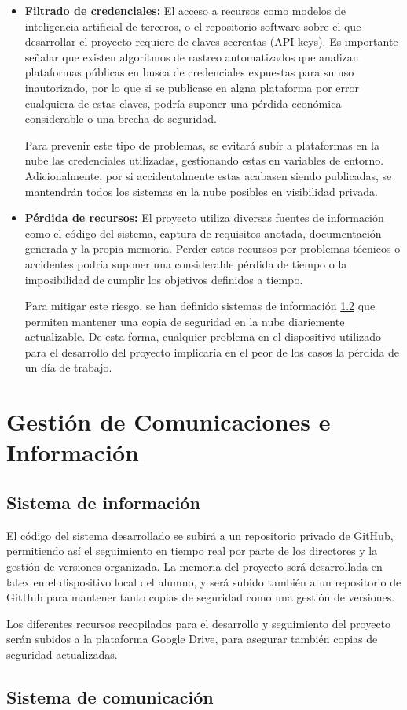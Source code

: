 \begin{itemize}
  \item\textbf{Filtrado de credenciales: }El acceso a recursos como modelos de inteligencia artificial de terceros, o el repositorio software sobre el que desarrollar el proyecto requiere de claves secreatas (API-keys). Es importante señalar que existen algoritmos de rastreo automatizados que analizan plataformas públicas en busca de credenciales expuestas para su uso inautorizado, por lo que si se publicase en algna plataforma por error cualquiera de estas claves, podría suponer una pérdida económica considerable o una brecha de seguridad.

Para prevenir este tipo de problemas, se evitará subir a plataformas en la nube las credenciales utilizadas, gestionando estas en variables de entorno. Adicionalmente, por si accidentalmente estas acabasen siendo publicadas, se mantendrán todos los sistemas en la nube posibles en visibilidad privada.


  \item\textbf{Pérdida de recursos: }El proyecto utiliza diversas fuentes de información como el código del sistema, captura de requisitos anotada, documentación generada y la propia memoria. Perder estos recursos por problemas técnicos o accidentes podría suponer una considerable pérdida de tiempo o la imposibilidad de cumplir los objetivos definidos a tiempo.

Para mitigar este riesgo, se han definido sistemas de información \ref{} que permiten mantener una copia de seguridad en la nube diariemente actualizable. De esta forma, cualquier problema en el dispositivo utilizado para el desarrollo del proyecto implicaría en el peor de los casos la pérdida de un día de trabajo. 
\end{itemize}

\section{Gestión de Comunicaciones e Información}

\subsection{Sistema de información}

El código del sistema desarrollado se subirá a un repositorio privado de GitHub, permitiendo así el seguimiento en tiempo real por parte de los directores y la gestión de versiones organizada. La memoria del proyecto será desarrollada en latex en el dispositivo local del alumno, y será subido también a un repositorio de GitHub para mantener tanto copias de seguridad como una gestión de versiones. 

Los diferentes recursos recopilados para el desarrollo y seguimiento del proyecto serán subidos a la plataforma Google Drive, para asegurar también copias de seguridad actualizadas. 

\subsection{Sistema de comunicación}











